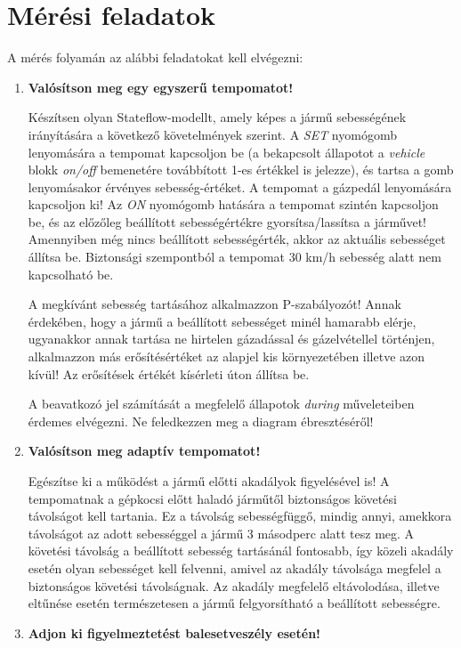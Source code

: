 \chapter{Mérési feladatok}\label{sect:LatexTools}
%

A mérés folyamán az alábbi feladatokat kell elvégezni:
\begin{enumerate}
	\item \textbf{Valósítson meg egy egyszerű tempomatot!}
	
		Készítsen olyan Stateflow-modellt, amely képes a jármű sebességének irányítására a következő követelmények szerint. A \textit{SET} nyomógomb lenyomására a tempomat kapcsoljon be (a bekapcsolt állapotot a \textit{vehicle} blokk \textit{on/off} bemenetére továbbított 1-es értékkel is jelezze), és tartsa a gomb lenyomásakor érvényes sebesség-értéket. A tempomat a gázpedál lenyomására kapcsoljon ki! Az \textit{ON} nyomógomb hatására a tempomat szintén kapcsoljon be, és az előzőleg beállított sebességértékre gyorsítsa/lassítsa a járművet! Amennyiben még nincs beállított sebességérték, akkor az aktuális sebességet állítsa be. Biztonsági szempontból a tempomat 30 km/h sebesség alatt nem kapcsolható be.
		
		A megkívánt sebesség tartásához alkalmazzon P-szabályozót! Annak érdekében, hogy a jármű a beállított sebességet minél hamarabb elérje, ugyanakkor annak tartása ne hirtelen gázadással és gázelvétellel történjen, alkalmazzon más erősítésértéket az alapjel kis környezetében illetve azon kívül! Az erősítések értékét kísérleti úton állítsa be.
		
		A beavatkozó jel számítását a megfelelő állapotok \textit{during} műveleteiben érdemes elvégezni. Ne feledkezzen meg a diagram ébresztéséről!
	\item \textbf{Valósítson meg adaptív tempomatot!}
	
		Egészítse ki a működést a jármű előtti akadályok figyelésével is! A tempomatnak a gépkocsi előtt haladó járműtől biztonságos követési távolságot kell tartania. Ez a távolság sebességfüggő, mindig annyi, amekkora távolságot az adott sebességgel a jármű 3 másodperc alatt tesz meg. A követési távolság a beállított sebesség tartásánál fontosabb, így közeli akadály esetén olyan sebességet kell felvenni, amivel az akadály távolsága megfelel a biztonságos követési távolságnak. Az akadály megfelelő eltávolodása, illetve eltűnése esetén természetesen a jármű felgyorsítható a beállított sebességre.
		\newpage
	\item \textbf{Adjon ki figyelmeztetést balesetveszély esetén!}
	

\end{enumerate}
